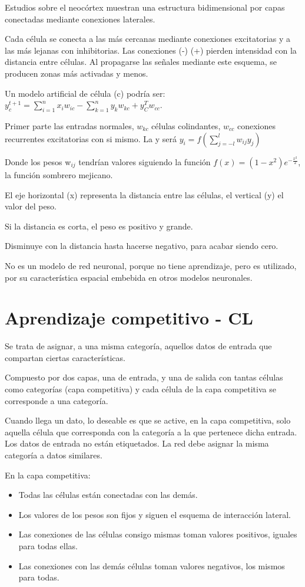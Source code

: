\documentclass[12pt, twoside, openright]{report} %
\begin{document}
Estudios sobre el neocórtex muestran una estructura bidimensional por capas conectadas mediante conexiones laterales.

Cada célula se conecta a las más cercanas mediante conexiones excitatorias y a las más lejanas con inhibitorias. Las conexiones (-) (+) pierden intensidad con la distancia entre células. Al propagarse las señales mediante este esquema, se producen zonas más activadas y menos.

Un modelo artificial de célula (c) podría ser: $y_c^{t+1}=\sum^n_{i=1} x_i w_{ic} - \sum^n_{k=1} y_k w_{kc}+y^T_C w_{cc}$.


Primer parte las entradas normales, $w_{kc}$ células colindantes, $w_{cc}$ conexiones recurrentes excitatorias con si mismo. La y será $y_i = f \left(\sum^l_{j=-l} w_{ij}y_j\right)$

Donde los pesos w$_{ij}$ tendrían valores siguiendo la función $f(x) = (1 - x^2)e^{- \frac{x^2}{2}}$, la función sombrero mejicano.

El eje horizontal (x) representa la distancia entre las células, el vertical (y) el valor del peso.

Si la distancia es corta, el peso es positivo y grande.

Disminuye con la distancia hasta hacerse negativo, para acabar siendo cero.

No es un modelo de red neuronal, porque no tiene aprendizaje, pero es utilizado, por su característica espacial embebida en otros modelos neuronales.

\section{Aprendizaje competitivo - CL}
Se trata de asignar, a una misma categoría, aquellos datos de entrada que compartan ciertas características.

Compuesto por dos capas, una de entrada, y una de salida con tantas células como categorías (capa competitiva) y cada célula de la capa competitiva se corresponde a una categoría.

Cuando llega un dato, lo deseable es que se active, en la capa competitiva, solo aquella célula que corresponda con la categoría a la que pertenece dicha entrada. Los datos de entrada no están etiquetados. La red debe asignar la misma categoría a datos similares.

En la capa competitiva:
\begin{itemize}
	\item Todas las células están conectadas con las demás.
	\item Los valores de los pesos son fijos y siguen el esquema de interacción lateral.
	\item Las conexiones de las células consigo mismas toman valores positivos, iguales para todas ellas.
	\item Las conexiones con las demás células toman valores negativos, los mismos para todas.
\end{itemize}
\end{document}
